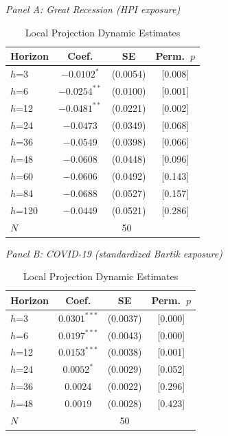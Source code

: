 \begin{table}[H]
\centering
\caption{Local Projection Dynamic Estimates}
\begin{threeparttable}
\small

\textit{Panel A: Great Recession (HPI exposure)}
\vspace{0.3em}

\begin{tabular}{lccc}
\toprule
Horizon & Coef. & SE & Perm.~$p$ \\
\midrule
$h$=3 & $-0.0102^{*}$ & (0.0054) & [0.008] \\
$h$=6 & $-0.0254^{**}$ & (0.0100) & [0.001] \\
$h$=12 & $-0.0481^{**}$ & (0.0221) & [0.002] \\
$h$=24 & $-0.0473$ & (0.0349) & [0.068] \\
$h$=36 & $-0.0549$ & (0.0398) & [0.066] \\
$h$=48 & $-0.0608$ & (0.0448) & [0.096] \\
$h$=60 & $-0.0606$ & (0.0492) & [0.143] \\
$h$=84 & $-0.0688$ & (0.0527) & [0.157] \\
$h$=120 & $-0.0449$ & (0.0521) & [0.286] \\
\midrule
$N$ & \multicolumn{3}{c}{50} \\
\bottomrule
\end{tabular}

\vspace{1em}
\textit{Panel B: COVID-19 (standardized Bartik exposure)}
\vspace{0.3em}

\begin{tabular}{lccc}
\toprule
Horizon & Coef. & SE & Perm.~$p$ \\
\midrule
$h$=3 & $0.0301^{***}$ & (0.0037) & [0.000] \\
$h$=6 & $0.0197^{***}$ & (0.0043) & [0.000] \\
$h$=12 & $0.0153^{***}$ & (0.0038) & [0.001] \\
$h$=24 & $0.0052^{*}$ & (0.0029) & [0.052] \\
$h$=36 & $0.0024$ & (0.0022) & [0.296] \\
$h$=48 & $0.0019$ & (0.0028) & [0.423] \\
\midrule
$N$ & \multicolumn{3}{c}{50} \\
\bottomrule
\end{tabular}


\end{threeparttable}
\end{table}
